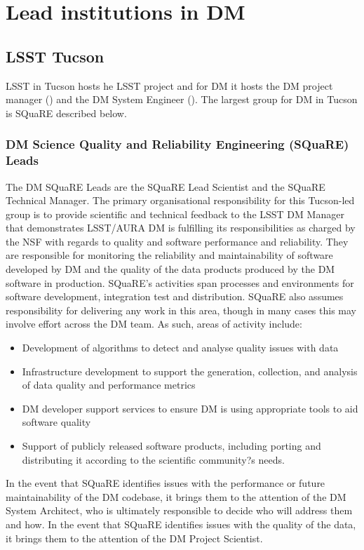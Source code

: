 \section {Lead institutions in DM } \label{sect:leadtutes}
\subsection {LSST Tucson}\label{sect:tucson}
LSST in Tucson hosts he LSST project and for DM it hosts  the DM project manager () and the DM System Engineer (). The largest group for DM in Tucson is SQuaRE described below. 

\subsubsection{DM Science Quality and Reliability Engineering (SQuaRE) Leads \label{sect:square}}
The DM SQuaRE Leads are the SQuaRE Lead Scientist and the SQuaRE Technical Manager.  The primary organisational responsibility for this Tucson-led group is to provide scientific and technical feedback to the LSST DM Manager that demonstrates LSST/AURA DM is fulfilling its responsibilities as charged by the NSF with regards to quality and software performance and reliability.
They are responsible for monitoring the reliability and maintainability of software developed by DM and the quality of the data products produced by the DM software in production. SQuaRE's activities span processes and environments for software development, integration test and distribution.  SQuaRE also assumes responsibility for delivering any work in this area, though in many cases this may involve effort across the DM team.
As such, areas of activity include:
\begin{itemize}
	\item Development of algorithms to detect and analyse quality issues with data
	\item Infrastructure development to support the generation, collection, and analysis of data quality and performance metrics
	\item DM developer support services to ensure DM is using appropriate tools to aid software quality
	\item Support of publicly released software products, including porting and distributing it according to the scientific community?s needs.
\end{itemize}

In the event that SQuaRE identifies issues with the performance or future maintainability of the DM codebase, it brings them to the attention of the DM System Architect, who is ultimately responsible to decide who will address them and how. In the event that SQuaRE identifies issues with the quality of the data, it brings them to the attention of the DM Project Scientist.


